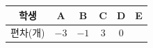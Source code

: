 {\renewcommand{\arraystretch}{1.35}\small
\begin{tabular}{|c|c|c|c|c|c|}
\hline
학생 & A & B & C & D & E \\ \hline
편차(개) & $-3$ & $-1$ & $3$ & $0$ & \\ \hline
\end{tabular}}

